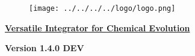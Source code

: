 
\begin{center}
\begin{figure}[!h]
\centering
\texttt{[image: ../../../../logo/logo.png]}
\end{figure}
\underline{\LARGE \textbf{Versatile Integrator for Chemical Evolution}}
\par
{\Large \textbf{Version 1.4.0 DEV}}
\end{center}
